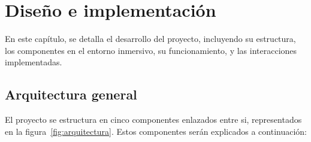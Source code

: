 \documentclass[a4paper, 12pt]{book}
\begin{document}

\cleardoublepage
\chapter{Diseño e implementación}
\label{chap:diseno}

En este capítulo, se detalla el desarrollo del proyecto, incluyendo su estructura, los componentes en el entorno 
inmersivo, su funcionamiento, y las interacciones implementadas.


\section{Arquitectura general} 
\label{sec:arquitectura}

El proyecto se estructura en cinco componentes enlazados entre si, representados en la figura~\ref{fig:arquitectura}. Estos componentes serán explicados a continuación:
\end{document}
